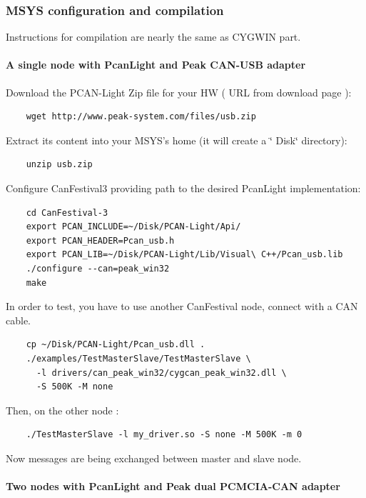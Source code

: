 \documentclass[12pt,english,a4paper]{book}
\begin{document}
\subsubsection{MSYS configuration and compilation}

Instructions for compilation are nearly the same as CYGWIN part.


\paragraph{A single node with PcanLight and Peak CAN-USB adapter}

Download the PCAN-Light Zip file for your HW ( URL from download page
):

\begin{verbatim}
	wget http://www.peak-system.com/files/usb.zip
\end{verbatim}

Extract its content into your MSYS's home (it will create a \char`\"{}
Disk\char`\"{} directory):


\begin{verbatim}
	unzip usb.zip
\end{verbatim}


Configure CanFestival3 providing path to the desired PcanLight implementation:

\begin{verbatim}
	cd CanFestival-3
	export PCAN_INCLUDE=~/Disk/PCAN-Light/Api/
	export PCAN_HEADER=Pcan_usb.h
	export PCAN_LIB=~/Disk/PCAN-Light/Lib/Visual\ C++/Pcan_usb.lib
	./configure --can=peak_win32
	make
\end{verbatim}

In order to test, you have to use another CanFestival node, connect
with a CAN cable.


\begin{verbatim}
	cp ~/Disk/PCAN-Light/Pcan_usb.dll .
	./examples/TestMasterSlave/TestMasterSlave \
	  -l drivers/can_peak_win32/cygcan_peak_win32.dll \
	  -S 500K -M none
\end{verbatim}

Then, on the other node :

\begin{verbatim}
	./TestMasterSlave -l my_driver.so -S none -M 500K -m 0
\end{verbatim}
Now messages are being exchanged between master and slave node.


\paragraph{Two nodes with PcanLight and Peak dual PCMCIA-CAN adapter}
\end{document}
